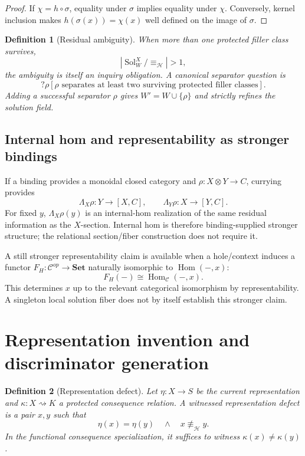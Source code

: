 \documentclass[11pt,oneside]{article}
\newtheorem{definition}{Definition}[section]
\begin{document}
\begin{proof}
If \(\chi=h\circ\sigma\), equality under \(\sigma\) implies equality under \(\chi\).
Conversely, kernel inclusion makes \(h(\sigma(x))=\chi(x)\) well defined on the image
of \(\sigma\).
\end{proof}

\begin{definition}[Residual ambiguity]
When more than one protected filler class survives,
\[
\left|\operatorname{Sol}^{X}_{W}/{\equiv_{\mathcal H}}\right|>1,
\]
the ambiguity is itself an inquiry obligation.  A canonical separator question is
\[
\boxed{
?\rho[
\rho\text{ separates at least two surviving protected filler classes}
].
}
\]
Adding a successful separator \(\rho\) gives \(W'=W\cup\{\rho\}\) and strictly refines the solution field.
\end{definition}

\subsection{Internal hom and representability as stronger bindings}

If a binding provides a monoidal closed category and \(\rho:X\otimes Y\to C\), currying provides
\[
\Lambda_X\rho:Y\to[X,C],
\qquad
\Lambda_Y\rho:X\to[Y,C].
\]
For fixed \(y\), \(\Lambda_X\rho(y)\) is an internal-hom realization of the same residual information as the \(X\)-section.  Internal hom is therefore binding-supplied stronger structure; the relational section/fiber construction does not require it.

A still stronger representability claim is available when a hole/context induces a functor \(F_H:\mathcal C^{op}\to\mathbf{Set}\) naturally isomorphic to \(\operatorname{Hom}(-,x)\):
\[
\boxed{
F_H(-)\cong\operatorname{Hom}_{\mathcal C}(-,x).
}
\]
This determines \(x\) up to the relevant categorical isomorphism by representability.  A singleton local solution fiber does not by itself establish this stronger claim.

\section{Representation invention and discriminator generation}

\begin{definition}[Representation defect]
Let \(\eta:X\to S\) be the current representation and \(\kappa:X\rightsquigarrow K\) a protected consequence relation.  A witnessed representation defect is a pair \(x,y\) such that
\[
\boxed{
\eta(x)=\eta(y)
\quad\land\quad
x\not\equiv_{\mathcal H}y.
}
\]
In the functional consequence specialization, it suffices to witness \(\kappa(x)\neq\kappa(y)\).
\end{definition}
\end{document}
